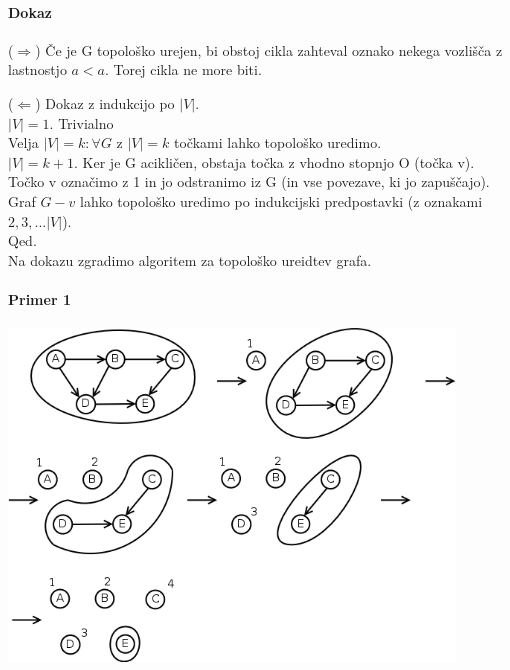 \documentclass[a4paper,10pt]{article}
\begin{document}
\paragraph{Dokaz}
\begin{flushleft}
($\Rightarrow$) \v Ce je G topolo\v sko urejen, bi obstoj cikla zahteval oznako nekega vozli\v s\v ca z lastnostjo $a < a$. Torej cikla ne more biti.
\end{flushleft}
($\Leftarrow$) Dokaz z indukcijo po $|V|$. \\
$|V| = 1$. Trivialno \\
Velja $|V| = k: \forall G$ z $|V|=k$ to\v ckami lahko topolo\v sko uredimo. \\
$|V| = k + 1$. Ker je G acikli\v cen, obstaja to\v cka z vhodno stopnjo O (to\v cka v). To\v cko v ozna\v cimo z 1 in jo odstranimo iz G (in vse povezave, ki jo zapu\v s\v cajo). Graf $G - v$ lahko topolo\v sko uredimo po indukcijski predpostavki (z oznakami $2, 3,... |V|$). \\
Qed.\\
Na dokazu zgradimo algoritem za topolo\v sko ureidtev grafa.\\

\paragraph{Primer 1}
\begin{center}
	\includegraphics[width=11.85cm,height=8.85cm]{Slike/TopoloskoUrejanje6.png}
\end{center}
\end{document}
